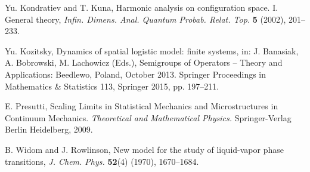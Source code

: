 \documentclass[reqno,11pt]{amsart}
\theoremstyle{definition}
\theoremstyle{remark}
\numberwithin{equation}{section}
\begin{document}
\begin{thebibliography}{ll}
 \newblock Yu.  Kondratiev and T.  Kuna, \newblock Harmonic analysis on configuration space. I. General
theory, \newblock \emph{ Infin. Dimens. Anal. Quantum Probab. Relat.
Top.} {\bf 5} (2002), 201--233.

 \newblock Yu. Kozitsky, Dynamics of spatial logistic model:  finite systems, in: J. Banasiak,
A. Bobrowski, M. Lachowicz (Eds.), Semigroups of Operators -- Theory
and Applications: Beedlewo, Poland, October 2013. Springer
Proceedings in Mathematics \& Statistics 113, Springer 2015, pp.
197--211.

 E. Presutti, Scaling Limits in Statistical
Mechanics and Microstructures in Continuum Mechanics.
\emph{Theoretical and Mathematical Physics.} Springer-Verlag Berlin
Heidelberg, 2009.

 \newblock B. Widom and J. Rowlinson, \newblock New model for the study of liquid-vapor phase transitions,
\newblock \emph{ J. Chem. Phys.}
{\bf 52}(4) (1970), 1670--1684.

\end{thebibliography}
\end{document}
